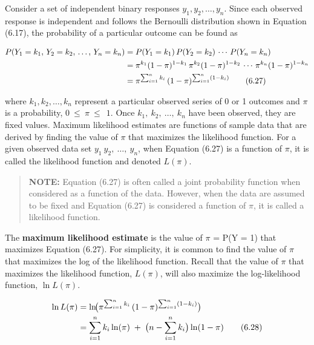 \documentclass[
]{report}
\begin{document}
Consider a set of independent binary responses \(\scriptstyle y_1, y_2, \dots, y_n\). Since each observed response is independent and follows the Bernoulli distribution shown in Equation (6.17), the probability of a particular outcome can be found as

\begin{align}
P(Y_1 = k_1,\,Y_2 = k_2,\,\dots,\,Y_n = k_n) 
&= P(Y_1 = k_1)\,P(Y_2 = k_2)\,\cdots\,P(Y_n = k_n) \notag \\
&= \pi^{k_1}(1 - \pi)^{1-k_1}\,\pi^{k_2}(1 - \pi)^{1-k_2}\,\cdots\,\pi^{k_n}(1 - \pi)^{1-k_n} \notag \\
&= \pi^{\sum_{i=1}^n k_i}\,(1 - \pi)^{\sum_{i=1}^n (1 - k_i)}
\tag{6.27}
\end{align}

where \(\scriptstyle k_1, k_2, \dots, k_n\) represent a particular observed series of 0 or 1 outcomes and \(\scriptstyle \pi\) is a probability, \(\scriptstyle 0 \ \le \ \pi \ \le \ \ 1\). Once \(\scriptstyle k_1, \  k_2, \ \dots, \ k_n\) have been observed, they are fixed values. Maximum likelihood estimates are functions of sample data that are derived by finding the value of \(\scriptstyle \pi\) that maximizes the likelihood function. For a given observed data set \(\scriptstyle y_1 \ y_2, \ \dots, \ y_n\), when Equation (6.27) is a function of \(\scriptstyle \pi\), it is called the likelihood function and denoted \(\scriptstyle L(\pi)\).

\begin{quote}
\textbf{NOTE:} Equation (6.27) is often called a joint probability function when considered as a function of the data. However, when the data are assumed to be fixed and Equation (6.27) is considered a function of \(\scriptstyle \pi\), it is called a likelihood function.
\end{quote}

The \textbf{maximum likelihood estimate} is the value of \(\scriptstyle \pi\) = P(Y = 1) that maximizes Equation (6.27). For simplicity, it is common to find the value of \(\scriptstyle \pi\) that maximizes the log of the likelihood function. Recall that the value of \(\scriptstyle \pi\) that maximizes the likelihood function, \(\scriptstyle L(\pi)\), will also maximize the log-likelihood function, \(\scriptstyle \ln L(\pi)\).

\begin{align}
\ln L(\pi)
&= \ln\!\bigl(\pi^{\sum_{i=1}^n k_i}\,(1 - \pi)^{\sum_{i=1}^n (1 - k_i)}\bigr) \notag \\
&= \sum_{i=1}^n k_i \ln(\pi)\;+\;\bigl(n - \sum_{i=1}^n k_i\bigr)\ln(1 - \pi)
\tag{6.28}
\end{align}
\end{document}
